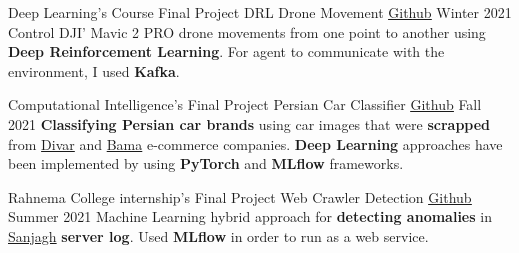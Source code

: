 
\begin{cventries}

  \cventry%
    {Deep Learning's Course Final Project} %
    {DRL Drone Movement} %
    {\href{https://github.com/zivdar001matin/drl-drone-movement}{\underline{Github}}} %
    {Winter 2021} %
    {Control DJI' Mavic 2 PRO drone movements from one point to another using {\textbf{Deep Reinforcement Learning}}. For agent to communicate with the environment, I used {\textbf{Kafka}}.}
    
  \cventry%
    {Computational Intelligence's Final Project} %
    {Persian Car Classifier} %
    {\href{https://github.com/zivdar001matin/computational-intelligence-final-project}{\underline{Github}}} %
    {Fall 2021} %
    {\textbf{Classifying Persian car brands} using car images that were \textbf{scrapped} from \href{https://divar.ir/}{Divar} and \href{https://bama.ir/}{Bama} e-commerce companies.
    \textbf{Deep Learning} approaches have been implemented by using \textbf{PyTorch} and \textbf{MLflow} frameworks.}
  
  \cventry%
    {Rahnema College internship's Final Project} %
    {Web Crawler Detection} %
    {\href{https://github.com/zivdar001matin/web-crawler-detection}{\underline{Github}}} %
    {Summer 2021} %
    {Machine Learning hybrid approach for {\textbf{detecting anomalies}} in \href{https://sanjagh.pro}{Sanjagh} {\textbf{server log}}. Used {\textbf{MLflow}} in order to run as a web service.}
\end{cventries}
